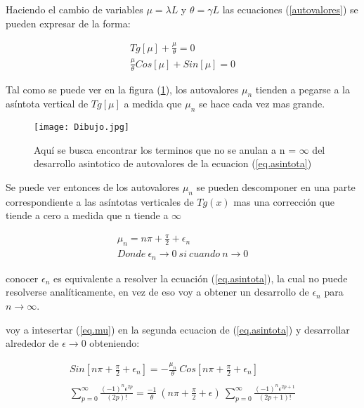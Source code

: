 Haciendo el cambio de variables $\mu = \lambda L$ y $\theta = \gamma L $ las ecuaciones (\ref{autovalores}) se pueden expresar de la forma:

\begin{equation}
\begin{array}{c}
    Tg[\mu] + \frac{\mu}{\theta} = 0 \\
    \frac{\mu}{\theta} Cos[\mu] + Sin[\mu] = 0
\end{array}
\label{eq.asintota}
\end{equation}

Tal como se puede ver en la figura (\ref{fig:Dibujo}), los autovalores $\mu _n$ tienden a pegarse a la asíntota vertical de $ Tg [ \mu ] $ a medida que $\mu _n$ se hace cada vez mas grande.

\begin{figure}
    \centering
    \texttt{[image: Dibujo.jpg]}
    \caption{Aquí se busca encontrar los terminos que no se anulan a n = $\infty$ del desarrollo asintotico de autovalores de la ecuacion (\ref{eq.asintota}) }
    \label{fig:Dibujo}
\end{figure}

Se puede ver entonces de los autovalores $\mu _n$ se pueden descomponer en una parte correspondiente a las asíntotas verticales de $Tg(x)$ mas una corrección que tiende a cero a medida que n tiende a $\infty$

\begin{equation}
\begin{array}{c}
    \mu _n = n \pi + \frac{\pi}{2} + \epsilon _n \\
    Donde \ \epsilon _n \rightarrow{0} \ si \ cuando \ n \rightarrow{0}
\end{array}
\label{eq.mu}
\end{equation}


conocer $\epsilon _n $ es equivalente a resolver la ecuación (\ref{eq.asintota}), la cual no puede resolverse analíticamente, en vez de eso voy a obtener un desarrollo de $\epsilon _n $ para $n \rightarrow \infty$.

voy a intesertar (\ref{eq.mu}) en la segunda ecuacion de (\ref{eq.asintota}) y desarrollar alrededor de $\epsilon \rightarrow{0}$ obteniendo:

\begin{equation}
\begin{array}{c}
    Sin[ n \pi + \frac{\pi}{2} + \epsilon _n ] = 
    - \frac{\mu _n}{\theta}  \ Cos[ n \pi + \frac{\pi}{2} + \epsilon _n ]  \\
 \\

         \sum _{p=0} ^{\infty} \frac{(-1) ^n  \epsilon ^{2 p }}{(2p)!} 
    =  \frac{-1}{\theta}  \ (n \pi + \frac{\pi}{2} + \epsilon ) \
     \sum _{p=0} ^{\infty} \frac{(-1) ^n \epsilon ^{2 p + 1}}{(2p+1)!} 
\end{array}
\end{equation}


